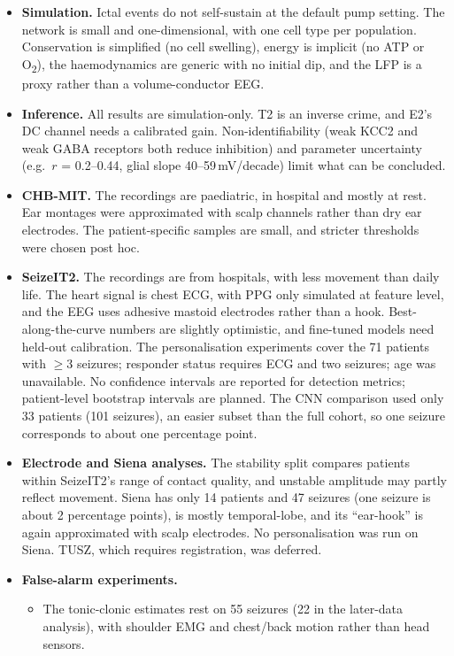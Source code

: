 \begin{itemize}
\item \textbf{Simulation.} Ictal events do not self-sustain at the default pump setting. The network is small and one-dimensional, with one cell type per population. Conservation is simplified (no cell swelling), energy is implicit (no ATP or O\textsubscript{2}), the haemodynamics are generic with no initial dip, and the LFP is a proxy rather than a volume-conductor EEG.
\item \textbf{Inference.} All results are simulation-only. T2 is an inverse crime, and E2's DC channel needs a calibrated gain. Non-identifiability (weak KCC2 and weak GABA receptors both reduce inhibition) and parameter uncertainty (e.g.\ $r$ = 0.2--0.44, glial slope 40--59\,mV/decade) limit what can be concluded.
\item \textbf{CHB-MIT.} The recordings are paediatric, in hospital and mostly at rest. Ear montages were approximated with scalp channels rather than dry ear electrodes. The patient-specific samples are small, and stricter thresholds were chosen post hoc.
\item \textbf{SeizeIT2.} The recordings are from hospitals, with less movement than daily life. The heart signal is chest ECG, with PPG only simulated at feature level, and the EEG uses adhesive mastoid electrodes rather than a hook. Best-along-the-curve numbers are slightly optimistic, and fine-tuned models need held-out calibration. The personalisation experiments cover the 71 patients with $\ge$3 seizures; responder status requires ECG and two seizures; age was unavailable. No confidence intervals are reported for detection metrics; patient-level bootstrap intervals are planned. The CNN comparison used only 33 patients (101 seizures), an easier subset than the full cohort, so one seizure corresponds to about one percentage point.
\item \textbf{Electrode and Siena analyses.} The stability split compares patients within SeizeIT2's range of contact quality, and unstable amplitude may partly reflect movement. Siena has only 14 patients and 47 seizures (one seizure is about 2 percentage points), is mostly temporal-lobe, and its ``ear-hook'' is again approximated with scalp electrodes. No personalisation was run on Siena. TUSZ, which requires registration, was deferred.
\item \textbf{False-alarm experiments.}
\begin{itemize}
\item The tonic-clonic estimates rest on 55 seizures (22 in the later-data analysis), with shoulder EMG and chest/back motion rather than head sensors.

\end{itemize}
\end{itemize}
